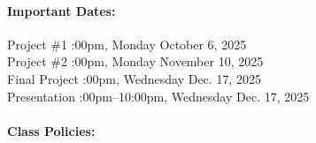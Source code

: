 \documentclass[11pt, a4paper]{article}
\begin{document}
\paragraph{Important Dates:}
\begin{center} \begin{minipage}{3.8in}
\begin{flushleft}
Project \#1      :00pm, Monday October 6, 2025 \\
Project \#2      :00pm, Monday November 10, 2025\\
Final Project    :00pm, Wednesday Dec. 17, 2025\\
Presentation :00pm--10:00pm, Wednesday Dec. 17, 2025\\
\end{flushleft}
\end{minipage}
\end{center}

\paragraph{Class Policies:}
\end{document}
